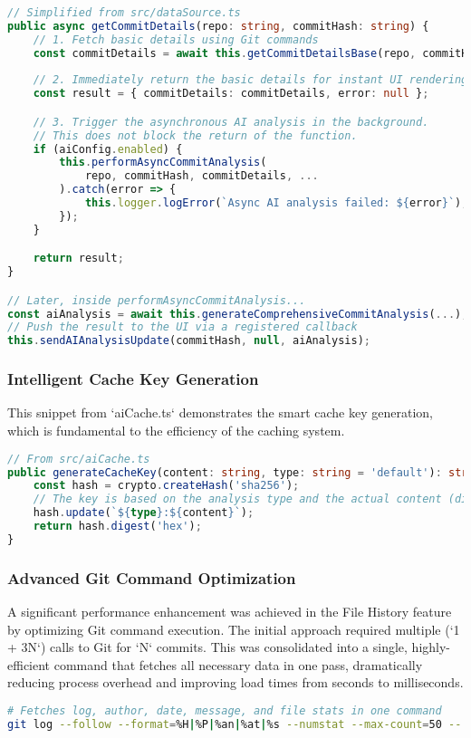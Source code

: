 \begin{lstlisting}[language=TypeScript, caption={Simplified from src/dataSource.ts}, label={lst:async}]
// Simplified from src/dataSource.ts
public async getCommitDetails(repo: string, commitHash: string) {
    // 1. Fetch basic details using Git commands
    const commitDetails = await this.getCommitDetailsBase(repo, commitHash);
    
    // 2. Immediately return the basic details for instant UI rendering
    const result = { commitDetails: commitDetails, error: null };

    // 3. Trigger the asynchronous AI analysis in the background.
    // This does not block the return of the function.
    if (aiConfig.enabled) {
        this.performAsyncCommitAnalysis(
            repo, commitHash, commitDetails, ...
        ).catch(error => {
            this.logger.logError(`Async AI analysis failed: ${error}`);
        });
    }

    return result;
}

// Later, inside performAsyncCommitAnalysis...
const aiAnalysis = await this.generateComprehensiveCommitAnalysis(...);
// Push the result to the UI via a registered callback
this.sendAIAnalysisUpdate(commitHash, null, aiAnalysis);
\end{lstlisting}

\subsubsection{Intelligent Cache Key Generation}
This snippet from `aiCache.ts` demonstrates the smart cache key generation, which is fundamental to the efficiency of the caching system.

\begin{lstlisting}[language=TypeScript, caption={From src/aiCache.ts}, label={lst:cachekey}]
// From src/aiCache.ts
public generateCacheKey(content: string, type: string = 'default'): string {
    const hash = crypto.createHash('sha256');
    // The key is based on the analysis type and the actual content (diff)
    hash.update(`${type}:${content}`);
    return hash.digest('hex');
}
\end{lstlisting}

\subsubsection{Advanced Git Command Optimization}
A significant performance enhancement was achieved in the File History feature by optimizing Git command execution. The initial approach required multiple (`1 + 3N`) calls to Git for `N` commits. This was consolidated into a single, highly-efficient command that fetches all necessary data in one pass, dramatically reducing process overhead and improving load times from seconds to milliseconds.

\begin{lstlisting}[language=bash, caption={Optimized single-pass Git command for file history}, label={lst:git-optim}]
# Fetches log, author, date, message, and file stats in one command
git log --follow --format=%H|%P|%an|%at|%s --numstat --max-count=50 -- filePath
\end{lstlisting} 
